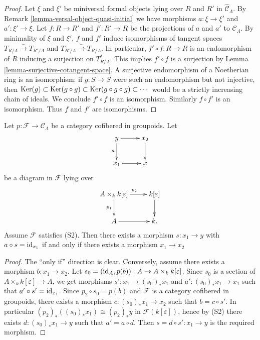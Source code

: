 \begin{proof}
Let $\xi$ and $\xi'$ be miniversal formal objects lying over $R$ and $R'$ in 
$\widehat{\mathcal C}_{\Lambda}$.  By Remark 
\ref{lemma-versal-object-quasi-initial} we have morphisms $a: \xi \rightarrow 
\xi'$ and $a': \xi' \rightarrow \xi$.  Let $f:R \rightarrow R'$ and $f': R' 
\rightarrow R$ be the projections of $a$ and $a'$ to $\mathcal C_{\Lambda}$.  
By minimality of $\xi$ and $\xi'$, $f$ and $f'$ induce isomorphisms of tangent 
spaces $T_{R/\Lambda} \xrightarrow{\sim} T_{R'/\Lambda}$ and $T_{R'/\Lambda} 
\xrightarrow{\sim} T_{R/\Lambda}$.  In particular, $f' \circ f: R \rightarrow 
R$ is an endomorphism of $R$ inducing a surjection on $T^*_{R/\Lambda}$. This 
implies $f' \circ f$ is a surjection by Lemma 
\ref{lemma-surjective-cotangent-space}. A surjective endomorphism of a 
Noetherian ring is an isomorphism: if $g: S \rightarrow S$ were such an 
endomorphism but not injective, then $\textnormal{Ker}(g) \subset 
\textnormal{Ker}(g \circ g) \subset \textnormal{Ker}(g \circ g \circ g) \subset 
\cdots$ would be a strictly increasing chain of ideals.  We conclude $f' \circ 
f$ is an isomorphism.  Similarly $f \circ f'$ is an isomorphism.  Thus $f$ and 
$f'$ are isomorphisms.
\end{proof}

\begin{lemma}
\label{lemma-lifting-section}
Let $p: \mathcal F \rightarrow \mathcal C_{\Lambda}$ be a category cofibered in 
groupoids.  Let 
\[
\xymatrix{
y \ar[r] \ar[d]_{a} & x_2 \ar[d] \\
x_1 \ar[r]        & x
}
\]
be a diagram in $\mathcal F$ lying over
\[
\xymatrix{
A \times_{k} k[\varepsilon] \ar[r]^{p_2} \ar[d]_{p_1} & k[\varepsilon] \ar[d] \\
A \ar[r] & k.
}
\]
Assume $\mathcal F$ satisfies \textnormal{(S2)}. Then there exists a morphism 
$s: x_1 \rightarrow y$ with $a \circ s = \textnormal{id}_{x_1}$ if and only if 
there exists a morphism $x_1 \rightarrow x_2$
\end{lemma}

\begin{proof}
The ``only if'' direction is clear.  Conversely, assume there exists a morphism 
$b: x_1 \rightarrow x_2$.  Let $s_0 = (\textnormal{id}_A, p(b)): A \rightarrow 
A \times_{k} k[\varepsilon]$.  Since $s_0$ is a section of $A \times_{k} 
k[\varepsilon] \rightarrow A$, we get morphisms $s': x_1 \rightarrow 
(s_0)_*x_1$ and $a': (s_0)_*x_1 \rightarrow x_1$ such that $a' \circ s' = 
\textnormal{id}_{x_1}$.  Since $p_2 \circ s_0 = p(b)$ and $\mathcal F$ is a 
category cofibered in groupoids, there exists a morphism $c: (s_0)_*x_1 
\rightarrow x_2$ such that $b = c \circ s'$.  In particular 
$(p_2)_*((s_0)_*x_1) \cong (p_2)_*y$ in $\mathcal F(k[\varepsilon])$, hence by 
(S2) there exists $d: (s_0)_*x_1 \rightarrow y$ such that $a' = a \circ d$.  
Then $s = d \circ s': x_1 \rightarrow y$ is the required morphism.
\end{proof}

